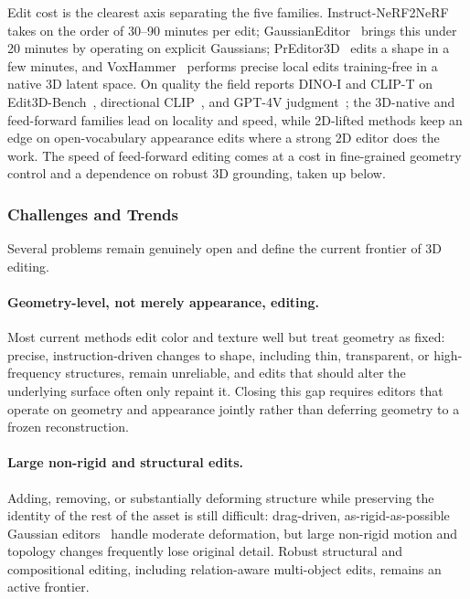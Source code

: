 Edit cost is the clearest axis separating the five families.
Instruct-NeRF2NeRF~\cite{haque2023instructnerf2nerf} takes on the order of 30--90 minutes per edit; GaussianEditor~\cite{chen2024gaussianeditor} brings this under 20 minutes by operating on explicit Gaussians; PrEditor3D~\cite{erkocc2025preditor3d} edits a shape in a few minutes, and VoxHammer~\cite{li2025voxhammer} performs precise local edits training-free in a native 3D latent space.
On quality the field reports DINO-I and CLIP-T on Edit3D-Bench~\cite{li2025voxhammer}, directional CLIP~\cite{wynn2025morpheus}, and GPT-4V judgment~\cite{wu2024gpt4vt23dgen}; the 3D-native and feed-forward families lead on locality and speed, while 2D-lifted methods keep an edge on open-vocabulary appearance edits where a strong 2D editor does the work.
The speed of feed-forward editing comes at a cost in fine-grained geometry control and a dependence on robust 3D grounding, taken up below.


\subsubsection{Challenges and Trends}
\label{subsubsec:p3_s8_2_5_challenges}

Several problems remain genuinely open and define the current frontier of 3D editing.

\paragraph{Geometry-level, not merely appearance, editing.}
Most current methods edit color and texture well but treat geometry as fixed: precise, instruction-driven changes to shape, including thin, transparent, or high-frequency structures, remain unreliable, and edits that should alter the underlying surface often only repaint it. Closing this gap requires editors that operate on geometry and appearance jointly rather than deferring geometry to a frozen reconstruction.

\paragraph{Large non-rigid and structural edits.}
Adding, removing, or substantially deforming structure while preserving the identity of the rest of the asset is still difficult: drag-driven, as-rigid-as-possible Gaussian editors~\cite{han2025arapgs} handle moderate deformation, but large non-rigid motion and topology changes frequently lose original detail. Robust structural and compositional editing, including relation-aware multi-object edits, remains an active frontier.

